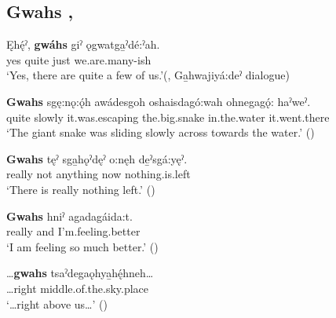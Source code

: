 \subsection*{\textbf{Gwahs} , } \label{p:[gwahs] ‘really’}

\ea
\label{ex:gpar97}
\gll Ęhę́ˀ, \textbf{gwáhs} giˀ ǫgwatga̱ˀdé:ˀah.\\
yes quite just we.are.many-ish\\
\glt ‘Yes, there are quite a few of us.’(\cite[257]{mithun_watewayestanih_1984}, Ga̱hwajiyá:deˀ dialogue)
\z

\ea
\label{ex:gpar98}
\gll \textbf{Gwahs} sgę:nǫ:ǫ́h awádesgoh oshaisdagó:wah ohnegagǫ́: haˀweˀ.\\
quite slowly it.was.escaping the.big.snake in.the.water it.went.there\\
\glt ‘The giant snake was sliding slowly across towards the water.’ (\cite{carrier_legends_2013})
\z

\ea
\label{ex:gpar99}
\gll \textbf{Gwahs} tęˀ sga̱hǫˀdęˀ o:nęh de̱ˀsgá:yęˀ.\\
really not anything now nothing.is.left\\
\glt ‘There is really nothing left.’ (\cite{carrier_legends_2013})
\z

\ea
\label{ex:gpar100}
\gll \textbf{Gwahs} hniˀ agadagáida:t.\\
really and I’m.feeling.better\\
\glt ‘I am feeling so much better.’ (\cite{carrier_legends_2013})
\z

\ea
\label{ex:gpar101}
\gll …\textbf{gwahs} tsaˀdegaǫhya̱hę́hneh…\\
…right middle.of.the.sky.place\\
\glt ‘…right above us…’ (\cite{carrier_legends_2013})
\z

